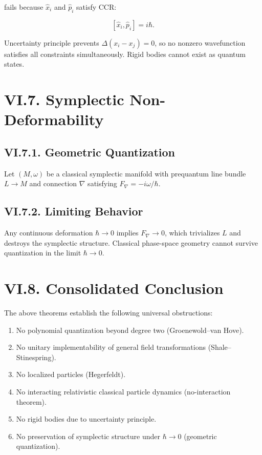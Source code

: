 \documentclass[12pt,oneside]{book}
\theoremstyle{plain}
\theoremstyle{definition}
\begin{document}
fails because $\widehat{x}_i$ and $\widehat{p}_i$ satisfy CCR:

\[
[\widehat{x}_i, \widehat{p}_i] = i \hbar.
\]

Uncertainty principle prevents $\Delta(x_i - x_j) = 0$, so no nonzero wavefunction satisfies all constraints simultaneously. Rigid bodies cannot exist as quantum states.

\section{VI.7. Symplectic Non-Deformability}

\subsection*{VI.7.1. Geometric Quantization}

Let $(M,\omega)$ be a classical symplectic manifold with prequantum line bundle $L \to M$ and connection $\nabla$ satisfying $F_\nabla = -i \omega/\hbar$.

\subsection*{VI.7.2. Limiting Behavior}

Any continuous deformation $\hbar \to 0$ implies $F_\nabla \to 0$, which trivializes $L$ and destroys the symplectic structure. Classical phase-space geometry cannot survive quantization in the limit $\hbar \to 0$.

\section{VI.8. Consolidated Conclusion}

The above theorems establish the following universal obstructions:

\begin{enumerate}
    \item No polynomial quantization beyond degree two (Groenewold–van Hove).
    \item No unitary implementability of general field transformations (Shale–Stinespring).
    \item No localized particles (Hegerfeldt).
    \item No interacting relativistic classical particle dynamics (no-interaction theorem).
    \item No rigid bodies due to uncertainty principle.
    \item No preservation of symplectic structure under $\hbar\to 0$ (geometric quantization).
\end{enumerate}
\end{document}
